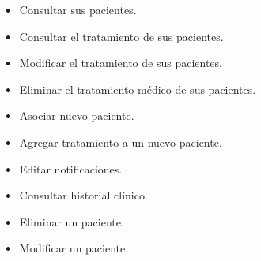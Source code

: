\begin{itemize}
\begin{itemize}
			\item Consultar sus pacientes.
			\item Consultar el tratamiento de sus pacientes.
			\item Modificar el tratamiento de sus pacientes.
			\item Eliminar el tratamiento médico de sus pacientes.
			\item Asociar nuevo paciente.
			\item Agregar tratamiento a un nuevo paciente.
			\item Editar notificaciones.
			\item Consultar historial clínico.
			\item Eliminar un paciente.
			\item Modificar un paciente.
			
		\end{itemize}


\end{itemize}
